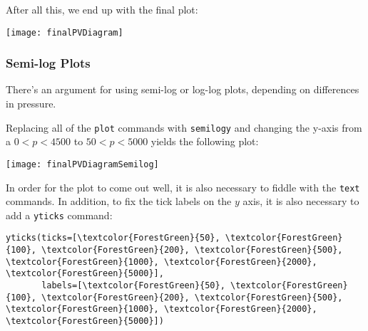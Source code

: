 After all this, we end up with the final plot:
\begin{center}
\texttt{[image: finalPVDiagram]}
\end{center}

\subsubsection{Semi-log Plots}
There's an argument for using semi-log or log-log plots, depending on differences in pressure.

Replacing all of the \verb~plot~ commands with \verb~semilogy~ and changing the y-axis from a $0<p<4500$ to $50<p<5000$ yields the following plot:

\begin{center}
\texttt{[image: finalPVDiagramSemilog]}
\end{center}

In order for the plot to come out well, it is also necessary to fiddle with the \verb~text~ commands.  In addition, to fix the tick labels on the $y$ axis, it is also necessary to add a \verb~yticks~ command:
\begin{Verbatim}[commandchars=\\\{\}]
yticks(ticks=[\textcolor{ForestGreen}{50}, \textcolor{ForestGreen}{100}, \textcolor{ForestGreen}{200}, \textcolor{ForestGreen}{500}, \textcolor{ForestGreen}{1000}, \textcolor{ForestGreen}{2000}, \textcolor{ForestGreen}{5000}], 
       labels=[\textcolor{ForestGreen}{50}, \textcolor{ForestGreen}{100}, \textcolor{ForestGreen}{200}, \textcolor{ForestGreen}{500}, \textcolor{ForestGreen}{1000}, \textcolor{ForestGreen}{2000}, \textcolor{ForestGreen}{5000}])
\end{Verbatim}



